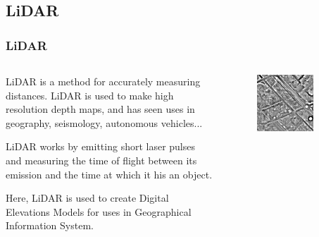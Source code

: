 \documentclass[aspectratio=169]{beamer}
\begin{document}
\subsection{LiDAR}
\begin{frame}
	\frametitle{LiDAR}
	\begin{columns}[T] %
		\begin{column}{.48\textwidth}
			LiDAR is a method for accurately measuring distances. LiDAR is used to make high resolution depth maps, and has seen uses in geography, seismology, autonomous vehicles... 

			LiDAR works by emitting short laser pulses and measuring the time of flight between its emission and the time at which it his an object.

			Here, LiDAR is used to create Digital Elevations Models for uses in Geographical Information System. 
		\end{column}%
		\hfill%
		\begin{column}{.48\textwidth}
			\begin{figure}
				\centering
				\includegraphics[width=0.75\textwidth]{lidarEx}
				\label{}
			\end{figure}
		\end{column}%
	\end{columns}

\end{frame}
\end{document}
